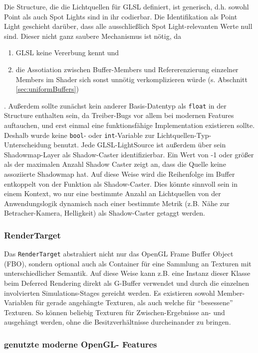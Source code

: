 	Die Structure, die die Lichtquellen für GLSL definiert, ist generisch, d.h. sowohl Point als auch Spot Lights
	sind in ihr codierbar. Die Identifikation als Point Light geschieht darüber, dass alle ausschließlich 
	Spot Light-relevanten Werte null sind. Dieser nicht ganz saubere Mechanismus ist nötig, da
	\begin{enumerate}
		\item GLSL keine Vererbung kennt und
	 	\item die Assotiation zwischen Buffer-Members und Refererenzierung einzelner Members im Shader sich sonst
	 		 unnötig verkomplizieren würde (s. Abschnitt \ref{sec:uniformBuffers})
	\end{enumerate}
	. Außerdem sollte zunächst kein anderer Basis-Datentyp als \lstinline|float| in der Structure enthalten sein,
	da Treiber-Bugs vor allem bei modernen Features auftauchen, und erst einmal eine funktionsfähige Implementation 	
	existieren sollte. Deshalb wurde keine \lstinline|bool|- oder \lstinline|int|-Variable zur Lichtquellen-Typ-	
	Unterscheidung benutzt. Jede GLSL-LightSource ist außerdem über sein Shadowmap-Layer als Shadow-Caster identifizierbar.
	Ein Wert von -1 oder größer als der maximalen Anzahl Shadow Caster zeigt an, dass die Quelle keine assoziierte
	Shadowmap hat. Auf diese Weise wird die Reihenfolge im Buffer entkoppelt von der Funktion als Shadow-Caster.
	Dies könnte sinnvoll sein in einem Kontext, wo nur eine bestimmte Anzahl an Lichtquellen von der Anwendungslogik
	dynamisch nach einer bestimmte Metrik (z.B. Nähe zur Betracher-Kamera, Helligkeit) als Shadow-Caster getaggt werden.
	
\subsubsection{RenderTarget}	
	Das \lstinline|RenderTarget| abstrahiert nicht nur das OpenGL Frame Buffer Object (FBO), sondern optional
	auch als Container für eine Sammlung an Texturen mit unterschiedlicher Semantik. Auf diese Weise kann z.B. 
	eine Instanz dieser Klasse beim Deferred Rendering direkt als G-Buffer verwendet und durch die einzelnen
	involvierten Simulations-Stages gereicht werden. Es existieren sowohl Member-Variablen für gerade angehängte
	Texturen, als auch welche für "`besessene"' Texturen. So können beliebig Texturen für Zwischen-Ergebnisse an-
	und ausgehängt werden, ohne die Besitzverhältnisse durcheinander zu bringen.
	


\subsubsection{genutzte moderne OpenGL- Features}	
	\label{sec:usedOpenGLfeatures}

